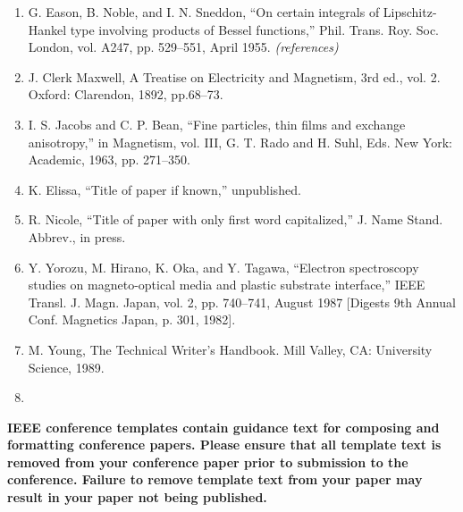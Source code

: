 \documentclass{article} %
\begin{document}
\noindent 

\begin{enumerate}
\item  G. Eason, B. Noble, and I. N. Sneddon, ``On certain integrals of Lipschitz-Hankel type involving products of Bessel functions,'' Phil. Trans. Roy. Soc. London, vol. A247, pp. 529--551, April 1955. \textit{(references)}

\item  J. Clerk Maxwell, A Treatise on Electricity and Magnetism, 3rd ed., vol. 2. Oxford: Clarendon, 1892, pp.68--73.

\item  I. S. Jacobs and C. P. Bean, ``Fine particles, thin films and exchange anisotropy,'' in Magnetism, vol. III, G. T. Rado and H. Suhl, Eds. New York: Academic, 1963, pp. 271--350.

\item  K. Elissa, ``Title of paper if known,'' unpublished.

\item  R. Nicole, ``Title of paper with only first word capitalized,'' J. Name Stand. Abbrev., in press.

\item  Y. Yorozu, M. Hirano, K. Oka, and Y. Tagawa, ``Electron spectroscopy studies on magneto-optical media and plastic substrate interface,'' IEEE Transl. J. Magn. Japan, vol. 2, pp. 740--741, August 1987 [Digests 9th Annual Conf. Magnetics Japan, p. 301, 1982].

\item  M. Young, The Technical Writer's Handbook. Mill Valley, CA: University Science, 1989.

\item  
\end{enumerate}

 \textbf{IEEE conference templates contain guidance text for composing and formatting conference papers. Please ensure that all template text is removed from your conference paper prior to submission to the conference. Failure to remove template text from your paper may result in your paper not being published.}
\end{document}

